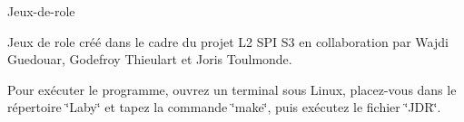Jeux-\/de-\/role

Jeux de role créé dans le cadre du projet L2 S\-P\-I S3 en collaboration par Wajdi Guedouar, Godefroy Thieulart et Joris Toulmonde.

Pour exécuter le programme, ouvrez un terminal sous Linux, placez-\/vous dans le répertoire \char`\"{}\-Laby\char`\"{} et tapez la commande \char`\"{}make\char`\"{}, puis exécutez le fichier \char`\"{}\-J\-D\-R\char`\"{}. 